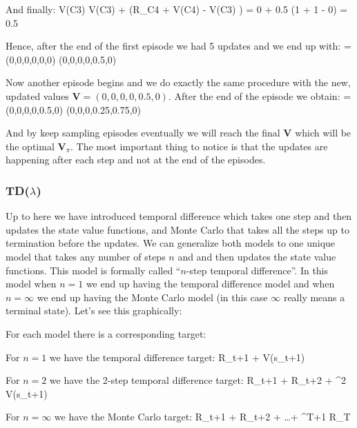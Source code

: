 And finally:
\bse
V(C3) \gets V(C3) + \alpha \left(R_{C4} + \gamma V(C4) - V(C3) \right) =
0 + 0.5 \cdot \left(1 + 1  - 0\right) = 0.5
\ese

Hence, after the end of the first episode we had 5 updates and we end up with:
\bse
{} = (0,0,0,0,0,0) \to (0,0,0,0,0.5,0)
\ese

Now another episode begins and we do exactly the same procedure with the new, updated values $\boldsymbol{V} = (0,0,
0,0,0.5,0)$. After the end of the episode we obtain:
\bse
{} = (0,0,0,0,0.5,0) \to (0,0,0,0.25,0.75,0)
\ese

And by keep sampling episodes eventually we will reach the final $\boldsymbol{V}$ which will be the optimal
$\boldsymbol{V}_{\pi}$. The most important thing to notice is that the updates are happening after each step and not
at the end of the episodes.

\subsubsection{TD($\lambda$)}

Up to here we have introduced temporal difference which takes one step and then updates the state value functions,
and Monte Carlo that takes all the steps up to termination before the updates. We can generalize both models to one
unique model that takes any number of steps $n$ and and then updates the state value functions. This model is
formally called ``$n$-step temporal difference''. In this model when $n=1$ we end up having the temporal difference
model and when $n=\infty$ we end up having the Monte Carlo model (in this case $\infty$ really means a terminal
state). Let's see this graphically:


\vspace{-15pt}

For each model there is a corresponding target:
\bit
\item For $n=1$ we have the temporal difference target:
\bse
R_{t+1} + \gamma V(s_{t+1})
\ese

\item For $n=2$ we have the 2-step temporal difference target:
\bse
R_{t+1} + \gamma R_{t+2} + \gamma^2 V(s_{t+1})
\ese

\item For $n=\infty$ we have the Monte Carlo target:
\bse
R_{t+1} + \gamma R_{t+2} + \ldots + \gamma^{T+1} R_T
\ese
\eit

